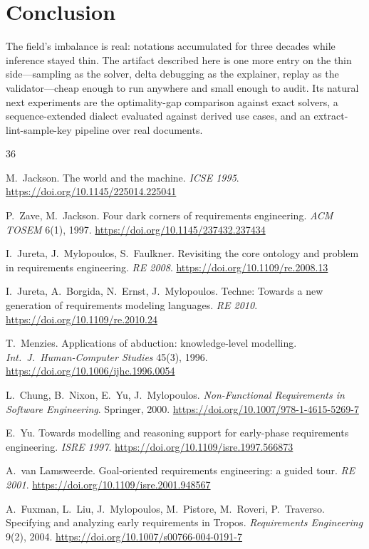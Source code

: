 \documentclass[sigconf,nonacm]{acmart}
\begin{document}
\section{Conclusion}

The field's imbalance is real: notations accumulated for three
decades while inference stayed thin. The artifact described
here is one more entry on the thin side---sampling as the
solver, delta debugging as the explainer, replay as the
validator---cheap enough to run anywhere and small enough to
audit. Its natural next experiments are the optimality-gap
comparison against exact solvers, a sequence-extended dialect
evaluated against derived use cases, and an
extract-lint-sample-key pipeline over real documents.

\begin{thebibliography}{36}

 M.~Jackson. The world and the machine.
\emph{ICSE 1995}. \url{https://doi.org/10.1145/225014.225041}

 P.~Zave, M.~Jackson. Four dark corners of
requirements engineering. \emph{ACM TOSEM} 6(1), 1997.
\url{https://doi.org/10.1145/237432.237434}

 I.~Jureta, J.~Mylopoulos, S.~Faulkner.
Revisiting the core ontology and problem in requirements
engineering. \emph{RE 2008}.
\url{https://doi.org/10.1109/re.2008.13}

 I.~Jureta, A.~Borgida, N.~Ernst,
J.~Mylopoulos. Techne: Towards a new generation of requirements
modeling languages. \emph{RE 2010}.
\url{https://doi.org/10.1109/re.2010.24}

 T.~Menzies. Applications of abduction:
knowledge-level modelling. \emph{Int.\ J.\ Human-Computer
Studies} 45(3), 1996.
\url{https://doi.org/10.1006/ijhc.1996.0054}

 L.~Chung, B.~Nixon, E.~Yu, J.~Mylopoulos.
\emph{Non-Functional Requirements in Software Engineering}.
Springer, 2000.
\url{https://doi.org/10.1007/978-1-4615-5269-7}

 E.~Yu. Towards modelling and reasoning support
for early-phase requirements engineering. \emph{ISRE 1997}.
\url{https://doi.org/10.1109/isre.1997.566873}

 A.~van Lamsweerde. Goal-oriented
requirements engineering: a guided tour. \emph{RE 2001}.
\url{https://doi.org/10.1109/isre.2001.948567}

 A.~Fuxman, L.~Liu, J.~Mylopoulos,
M.~Pistore, M.~Roveri, P.~Traverso. Specifying and analyzing
early requirements in Tropos. \emph{Requirements Engineering}
9(2), 2004. \url{https://doi.org/10.1007/s00766-004-0191-7}


\end{thebibliography}
\end{document}
